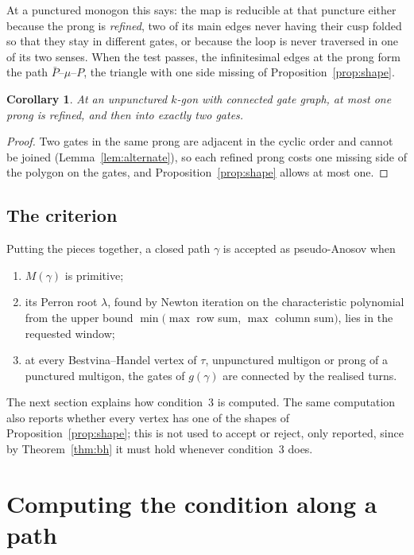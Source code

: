 \documentclass[12pt]{amsart}
\newcommand{\anti}[1]{\bar{#1}}          %
\newcommand{\trk}{\tau}                   %
\newcommand{\per}{P}                      %
\newcommand{\lam}{\lambda}
\theoremstyle{plain}
\newtheorem{Corollary}[Theorem]{Corollary}
\theoremstyle{definition}
\begin{document}
At a punctured monogon this says: the map is reducible at that puncture
either because the prong is \emph{refined}, two of its main edges never
having their cusp folded so that they stay in different gates, or because
the loop is never traversed in one of its two senses.  When the test
passes, the infinitesimal edges at the prong form the path
$\anti\per$--$\mu$--$\per$, the triangle with one side missing of
Proposition~\ref{prop:shape}.

\begin{Corollary}
  \label{cor:unpunctured}
  At an unpunctured $k$-gon with connected gate graph, at most one prong
  is refined, and then into exactly two gates.
\end{Corollary}
\begin{proof}
  Two gates in the same prong are adjacent in the cyclic order and cannot
  be joined (Lemma~\ref{lem:alternate}), so each refined prong costs one
  missing side of the polygon on the gates, and
  Proposition~\ref{prop:shape} allows at most one.
\end{proof}


\subsection{The criterion}
\label{sec:criterion-summary}
Putting the pieces together, a closed path $\gamma$ is accepted as
pseudo-Anosov when
\begin{enumerate}
  \item $M(\gamma)$ is primitive;
  \item its Perron root $\lam$, found by Newton iteration on the
    characteristic polynomial from the upper bound $\min(\max$ row sum,
    $\max$ column sum$)$, lies in the requested window;
  \item at every Bestvina--Handel vertex of $\trk$, unpunctured multigon
    or prong of a punctured multigon, the gates of $g(\gamma)$ are
    connected by the realised turns.
\end{enumerate}
The next section explains how condition~3 is computed.  The same
computation also reports whether every vertex has one of the shapes of
Proposition~\ref{prop:shape}; this is not used to accept or reject, only
reported, since by Theorem~\ref{thm:bh} it must hold whenever
condition~3 does.


\section{Computing the condition along a path}
\label{sec:computing}
\end{document}
